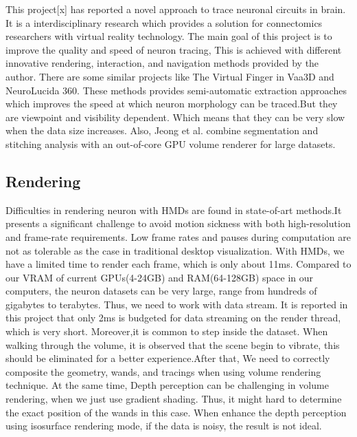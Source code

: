 \documentclass[10pt,twocolumn,letterpaper]{article}
\begin{document}
This project[x] has reported a novel approach to trace neuronal circuits in brain. It is a interdisciplinary research which provides a solution for connectomics researchers with virtual reality technology. The main goal of this project is to improve the quality and speed of neuron tracing, This is achieved with different innovative rendering, interaction, and navigation methods provided by the author. There are some similar projects like The Virtual Finger in Vaa3D and NeuroLucida 360. These methods provides semi-automatic extraction approaches which improves the speed at which neuron morphology can be traced.But they are viewpoint and visibility dependent. Which means that they can be very slow when the data size increases. Also, Jeong et al. combine segmentation and stitching analysis with an out-of-core GPU volume renderer for large datasets.
\subsection{Rendering}
Difficulties in rendering neuron with HMDs are found in state-of-art methods.It presents a significant challenge to avoid motion sickness with both high-resolution and frame-rate requirements. Low frame rates and pauses during computation are not as tolerable as the case in traditional desktop visualization. With HMDs, we have a limited time to render each frame, which is only about 11ms. Compared to our VRAM of current GPUs(4-24GB) and RAM(64-128GB) space in our computers, the neuron datasets can be very large, range from hundreds of gigabytes to terabytes. Thus, we need to work with data stream. It is reported in this project that only 2ms is budgeted for data streaming on the render thread, which is very short. Moreover,it is common to step inside the dataset. When walking through the 
volume, it is observed that the scene begin to vibrate, this should be eliminated for a better experience.After that, We need to correctly composite the geometry, wands, and tracings when using volume rendering technique. At the same time, Depth perception can be challenging in volume rendering, when we just use gradient shading. Thus, it might hard to determine the exact position of the wands in this case. When enhance the depth perception using isosurface rendering mode, if the data is noisy, the result is not ideal.
\end{document}
